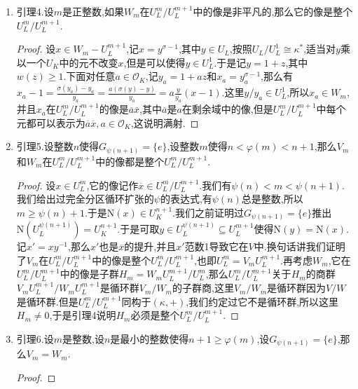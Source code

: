 \begin{enumerate}
\begin{proof}
    	记$n=\varphi(m)$,那么$m=\psi(n)$.设$x\in V_m$,设$\overline{x}$是$x$在$U_L^m/U_L^{m+1}$中的像.我们有$x$在$\mathrm{N}_n:U_L^m/U_L^{m+1}\to U_K^n/U_K^{n+1}$的核中,因为$x=z^{\sigma-1}$,得到$\mathrm{N}(x)=x^{1+\sigma+\cdots+\sigma^{r-1}}=z^{\sigma^r-1}=1$.但是我们之前给出过$\mathrm{N}_n$的核就是$G_m/G_{m+1}$,按照条件它是平凡的,所以$\overline{x}=0$,也即$x\in V_{m+1}$.
    \end{proof}
    \item 引理4.设$m$是正整数,如果$W_m$在$U_L^m/U_L^{m+1}$中的像是非平凡的,那么它的像是整个$U_L^m/U_L^{m+1}$.
    \begin{proof}
    	
    	设$x\in W_m-U_L^{m+1}$,记$x=y^{\sigma-1}$,其中$y\in U_L$,按照$U_L/U_L^1\cong\kappa^*$,适当对$y$乘以一个$U_K$中的元不改变$x$,但是可以使得$y\in U_L^1$.于是记$y=1+z$,其中$w(z)\ge1$.下面对任意$a\in\mathscr{O}_K$,记$y_a=1+az$和$x_a=y_a^{\sigma-1}$,那么有$x_a-1=\frac{\sigma(y_a)-y_a}{y_a}=\frac{a(\sigma(y)-y)}{y_a}=a\frac{y}{y_a}(x-1)$.这里$y/y_a\in U_L^1$,所以$x_a\in W_m$,并且$x_a$在$U_L^m/U_L^{m+1}$的像是$\overline{a}\overline{x}$,其中$\overline{a}$是$a$在剩余域中的像,但是$U_L^m/U_L^{m+1}$中每个元都可以表示为$\overline{a}\overline{x},a\in\mathscr{O}_K$,这说明满射.
    \end{proof}
    \item 引理5.设整数$n$使得$G_{\psi(n+1)}=\{e\}$,设整数$m$使得$n<\varphi(m)<n+1$,那么$V_m$和$W_m$在$U_L^m/U_L^{m+1}$中的像都是整个$U_L^m/U_L^{m+1}$.
    \begin{proof}
    	
    	设$x\in U_L^m$,它的像记作$\overline{x}\in U_L^m/U_L^{m+1}$.我们有$\psi(n)<m<\psi(n+1)$.我们给出过完全分区循环扩张的$\psi$的表达式,有$\psi(n)$总是整数,所以$m\ge\psi(n)+1$.于是$\mathrm{N}(x)\in U_K^{n+1}$.我们之前证明过$G_{\psi(n+1)}=\{e\}$推出$\mathrm{N}(U_L^{\psi(n+1)})=U_K^{n+1}$.于是可取$y\in U_L^{\psi(n+1)}\subseteq U_L^{m+1}$使得$\mathrm{N}(y)=\mathrm{N}(x)$.记$x'=xy^{-1}$,那么$x'$也是$\overline{x}$的提升,并且$x'$范数1导致它在$V$中.换句话讲我们证明了$V_m$在$U_L^m/U_L^{m+1}$中的像是整个$U_L^m/U_L^{m+1}$,也即$U_L^m=V_mU_L^{m+1}$.再考虑$W_m$,它在$U_L^m/U_L^{m+1}$中的像是子群$H_m=W_mU_L^{m+1}/U_L^m$,那么$U_L^m/U_L^{m+1}$关于$H_m$的商群$V_mU_L^{m+1}/W_mU_L^{m+1}$是循环群$V_m/W_m$的子群商,这里$V_m/W_m$是循环群因为$V/W$是循环群.但是$U_L^m/U_L^{m+1}$同构于$(\kappa,+)$,我们约定过它不是循环群,所以这里$H_m\not=0$,于是引理4说明$H_m$必须是整个$U_L^m/U_L^{m+1}$.
    \end{proof}
    \item 引理6.设$m$是整数,设$n$是最小的整数使得$n+1\ge\varphi(m)$,设$G_{\psi(n+1)}=\{e\}$,那么$V_m=W_m$.
    \begin{proof}
    	

\end{proof}
\end{enumerate}
